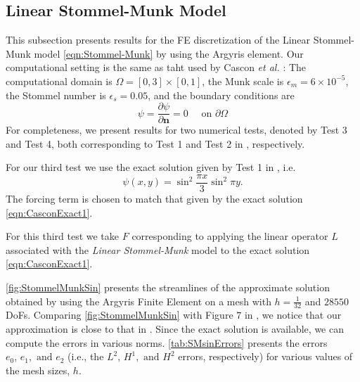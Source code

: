 \subsection{Linear Stommel-Munk Model}\label{sse:SMM}
This subsection presents results for the FE discretization of the Linear
Stommel-Munk model \eqref{eqn:Stommel-Munk} by using the Argyris element. Our
computational setting is the same as taht used by Cascon \emph{et al.}
\cite{Cascon}: The computational domain is $\Omega = [0,3]\times[0,1]$, the Munk
scale is $\epsilon_m=6\times 10^{-5}$, the Stommel number is $\epsilon_s=0.05$,
and the boundary conditions are
\begin{equation} \label{eqn:SMProb}
  \psi = \frac{\partial \psi}{\partial \mathbf{n}}=0 \quad \text{ on } \partial\Omega
\end{equation}
For completeness, we present results for two numerical tests, denoted by Test 3
and Test 4, both corresponding to Test 1 and Test 2 in \cite{Cascon},
respectively.

For our third test we use the exact solution given by Test 1 in \cite{Cascon},
i.e.
\begin{equation}
  \psi(x,y) = \sin^2 \frac{\pi x}{3} \sin^2 \pi y.
  \label{eqn:CasconExact1}
\end{equation}
The forcing term is chosen to match that given by the exact solution
\eqref{eqn:CasconExact1}.

For this third test we take $F$ corresponding to applying the linear operator
$L$ associated with the \emph{Linear Stommel-Munk} model to the exact solution
\eqref{eqn:CasconExact1}.

\autoref{fig:StommelMunkSin} presents the streamlines of the approximate
solution obtained by using the Argyris Finite Element on a mesh with
$h=\frac{1}{32}$ and $28550$ DoFs. Comparing \autoref{fig:StommelMunkSin} with
Figure $7$ in \cite{Myers}, we notice that our approximation is close to that in
\cite{Myers}. Since the exact solution is available, we can compute the errors
in various norms. \autoref{tab:SMsinErrors} presents the errors $e_0,\, e_1,
\text{ and } e_2$ (i.e., the $L^2,\, H^1, \text{ and } H^2$ errors,
respectively) for various values of the mesh sizes, $h$.

